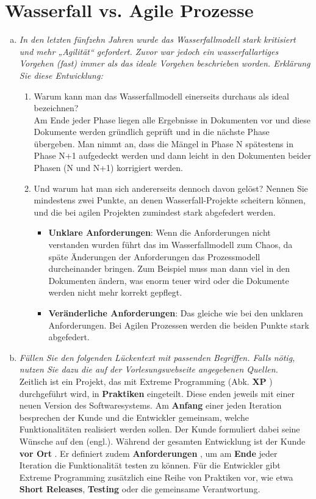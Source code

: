 \section{Wasserfall vs. Agile Prozesse}
\begin{enumerate}[(a)]
    \item {\itshape In den letzten fünfzehn Jahren wurde das Wasserfallmodell stark kritisiert und mehr
„Agilität“ gefordert. Zuvor war jedoch ein wasserfallartiges Vorgehen (fast) immer als
das ideale Vorgehen beschrieben worden. Erklärung Sie diese Entwicklung:
}
    \begin{enumerate}[1]
    \item Warum kann man das Wasserfallmodell einerseits durchaus als ideal bezeichnen?\\
    Am Ende jeder Phase liegen alle Ergebnisse in Dokumenten vor und diese Dokumente werden gründlich geprüft und in die nächste Phase übergeben. Man nimmt an, dass die Mängel in Phase N spätestens in Phase N+1 aufgedeckt werden und dann leicht in den Dokumenten beider Phasen (N und N+1) korrigiert werden.
    \item Und warum hat man sich andererseits dennoch davon gelöst? Nennen Sie mindestens zwei Punkte, an denen Wasserfall-Projekte scheitern können, und die bei agilen Projekten zumindest stark abgefedert werden.
    \begin{itemize}
        \item \textbf{Unklare Anforderungen}: Wenn die Anforderungen nicht verstanden wurden führt das im Wasserfallmodell zum Chaos, da späte Änderungen der Anforderungen das Prozessmodell durcheinander bringen. Zum Beispiel muss man dann viel in den Dokumenten ändern, was enorm teuer wird oder die Dokumente werden nicht mehr korrekt gepflegt.
        \item \textbf{Veränderliche Anforderungen}: Das gleiche wie bei den unklaren Anforderungen. Bei Agilen Prozessen werden die beiden Punkte stark abgefedert.
    \end{itemize}
    \end{enumerate}
    
    \item {\itshape Füllen Sie den folgenden Lückentext mit passenden Begriffen. Falls nötig, nutzen Sie
dazu die auf der Vorlesungswebseite angegebenen Quellen.
}\\
Zeitlich ist ein Projekt, das mit Extreme Programming (Abk. \textbf{XP} ) durchgeführt wird,
in \textbf{Praktiken} eingeteilt. Diese enden jeweils mit einer neuen Version des Softwaresystems. Am \textbf{Anfang} einer jeden Iteration besprechen der Kunde und die
Entwickler gemeinsam, welche Funktionalitäten realisiert werden sollen. Der Kunde
formuliert dabei seine Wünsche auf den (engl.). Während der gesamten
Entwicklung ist der Kunde \textbf{vor Ort} . Er definiert zudem \textbf{Anforderungen} ,
um am \textbf{Ende} jeder Iteration die Funktionalität testen zu können. Für die Entwickler gibt Extreme Programming zusätzlich eine Reihe von Praktiken vor, wie etwa
\textbf{Short Releases}, \textbf{Testing} oder die gemeinsame Verantwortung.

\end{enumerate}

